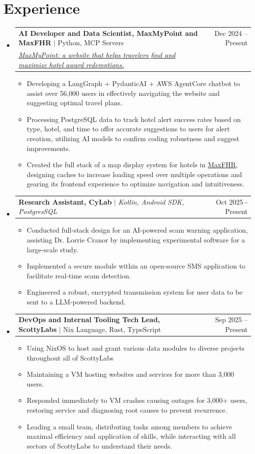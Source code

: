 \documentclass[letterpaper,11pt]{article}
\makeatletter
\newcommand{\resumeItem}[1]{
  \item\small{
    {#1 \vspace{-2pt}}
  }
}
\newcommand{\resumeProjectLinkHeading}[3]{
    \item
    \begin{tabular*}{0.97\textwidth}{l@{\extracolsep{\fill}}r}
      \small#1 & #2 \\
      \small#3 \\
    \end{tabular*}\vspace{-7pt}
}
\newcommand{\resumeSmallJob}[2]{
    \item
    \begin{tabular*}{0.97\textwidth}{l@{\extracolsep{\fill}}r}
      \small#1 & #2 \\
    \end{tabular*}\vspace{-7pt}
}
\newcommand{\resumeSubHeadingListStart}{\begin{itemize}[leftmargin=0.15in, label={}]}
\newcommand{\resumeSubHeadingListEnd}{\end{itemize}}
\newcommand{\resumeItemListStart}{\begin{itemize}}
\newcommand{\resumeItemListEnd}{\end{itemize}\vspace{-5pt}}
\makeatother
\begin{document}
\section{Experience}
    \resumeSubHeadingListStart
        \resumeProjectLinkHeading
              {\textbf{AI Developer and Data Scientist, MaxMyPoint and MaxFHR} $|$ Python, MCP Servers}{Dec 2024 -- Present}
            {\href{https://maxmypoint.com/}{\textit{\underline{MaxMyPoint}: a website that helps travelers find and maximize hotel award redemptions.}}}
              \resumeItemListStart
                \resumeItem{Developing a LangGraph + PydanticAI + AWS AgentCore chatbot to assist over 56,000 users in effectively navigating the website and suggesting optimal travel plans.}
                \resumeItem{Processing PostgreSQL data to track hotel alert success rates based on type, hotel, and time to offer accurate suggestions to users for alert creation, utilizing AI models to confirm coding robustness and suggest improvements.}
                \resumeItem{Created the full stack of a map display system for hotels in \href{https://maxfhr.com/}{\underline{MaxFHR}}, designing caches to increase loading speed over multiple operations and gearing its frontend experience to optimize navigation and intuitiveness.}
              \resumeItemListEnd

        \resumeSmallJob
        {\textbf{Research Assistant, CyLab} $|$ \emph{Kotlin, Android SDK, PostgresSQL}}{Oct 2025 - Present}
          \resumeItemListStart
            \resumeItem{Conducted full-stack design for an AI-powered scam warning application, assisting Dr. Lorrie Cranor by implementing experimental software for a large-scale study.}
            \resumeItem{Implemented a secure module within an open-source SMS application to facilitate real-time scam detection.}
            \resumeItem{Engineered a robust, encrypted transmission system for user data to be sent to a LLM-powered backend.}
          \resumeItemListEnd

        \resumeSmallJob
          {\textbf{DevOps and Internal Tooling Tech Lead, ScottyLabs} $|$ Nix Language, Rust, TypeScript}{Sep 2025 -- Present}
          \resumeItemListStart
            \resumeItem{Using NixOS to host and grant various data modules to diverse projects throughout all of ScottyLabs}
            \resumeItem{Maintaining a VM hosting websites and services for more than 3,000 users.}
            \resumeItem{Responded immediately to VM crashes causing outages for 3,000+ users, restoring service and diagnosing root causes to prevent recurrence.}
            \resumeItem{Leading a small team, distributing tasks among members to achieve maximal efficiency and application of skills, while interacting with all sectors of ScottyLabs to understand their needs.}
          \resumeItemListEnd
    \resumeSubHeadingListEnd
\end{document}

